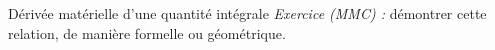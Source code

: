 \begin{frame}{Dérivée matérielle d'une quantité intégrale}
%
%
%
%
%
%
%
%
%
\textcolor{vert}{\sl Exercice (MMC) :} démontrer cette relation, de manière formelle ou géométrique.

\vspace{0mm}

\end{frame}

